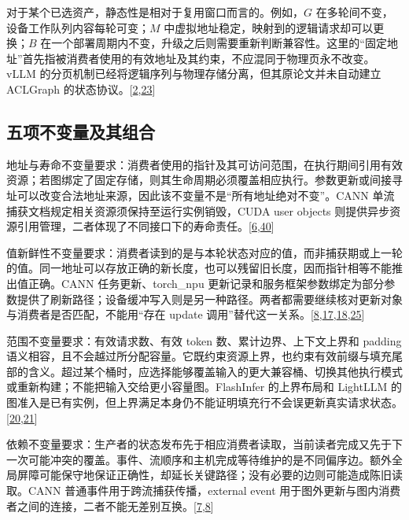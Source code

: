 \documentclass[
  UTF8,
  zihao=5]{ctexart}
\begin{document}
对于某个已选资产，静态性是相对于复用窗口而言的。例如，\(G\)
在多轮间不变，设备工作队列内容每轮可变；\(M\)
中虚拟地址稳定，映射到的逻辑请求却可以更换；\(B\)
在一个部署周期内不变，升级之后则需要重新判断兼容性。这里的``固定地址''首先指被消费者使用的有效地址及其约束，不应混同于物理页永不改变。vLLM
的分页机制已经将逻辑序列与物理存储分离，但其原论文并未自动建立 ACLGraph
的状态协议。{[}\protect\hyperlink{ref-kwon2023vllm}{2},\protect\hyperlink{ref-liu2026foundry}{23}{]}

\hypertarget{ux4e94ux9879ux4e0dux53d8ux91cfux53caux5176ux7ec4ux5408}{%
\subsection*{五项不变量及其组合}\label{ux4e94ux9879ux4e0dux53d8ux91cfux53caux5176ux7ec4ux5408}}

地址与寿命不变量要求：消费者使用的指针及其可访问范围，在执行期间引用有效资源；若图绑定了固定存储，则其生命周期必须覆盖相应执行。参数更新或间接寻址可以改变合法地址来源，因此该不变量不是``所有地址绝对不变''。CANN
单流捕获文档规定相关资源须保持至运行实例销毁，CUDA user objects
则提供异步资源引用管理，二者体现了不同接口下的寿命责任。{[}\protect\hyperlink{ref-cann910single}{6},\protect\hyperlink{ref-nvidia2025cudaguide}{40}{]}

值新鲜性不变量要求：消费者读到的是与本轮状态对应的值，而非捕获期或上一轮的值。同一地址可以存放正确的新长度，也可以残留旧长度，因而指针相等不能推出值正确。CANN
任务更新、torch\_npu
更新记录和服务框架参数绑定为部分参数提供了刷新路径；设备缓冲写入则是另一种路径。两者都需要继续核对更新对象与消费者是否匹配，不能用``存在
update
调用''替代这一关系。{[}\protect\hyperlink{ref-cann910update}{8},\protect\hyperlink{ref-vllmascend2026impl}{17},\protect\hyperlink{ref-sglang2026impl}{18},\protect\hyperlink{ref-torchnpu2026graphs}{25}{]}

范围不变量要求：有效请求数、有效 token 数、累计边界、上下文上界和
padding
语义相容，且不会越过所分配容量。它既约束资源上界，也约束有效前缀与填充尾部的含义。超过某个桶时，应选择能够覆盖输入的更大兼容桶、切换其他执行模式或重新构建；不能把输入交给更小容量图。FlashInfer
的上界布局和 LightLLM
的图准入是已有实例，但上界满足本身仍不能证明填充行不会误更新真实请求状态。{[}\protect\hyperlink{ref-lightllm2026code}{20},\protect\hyperlink{ref-ye2025flashinfer}{21}{]}

依赖不变量要求：生产者的状态发布先于相应消费者读取，当前读者完成又先于下一次可能冲突的覆盖。事件、流顺序和主机完成等待维护的是不同偏序边。额外全局屏障可能保守地保证正确性，却延长关键路径；没有必要的边则可能造成陈旧读取。CANN
普通事件用于跨流捕获传播，external event
用于图外更新与图内消费者之间的连接，二者不能无差别互换。{[}\protect\hyperlink{ref-cann910multi}{7},\protect\hyperlink{ref-cann910update}{8}{]}
\end{document}
